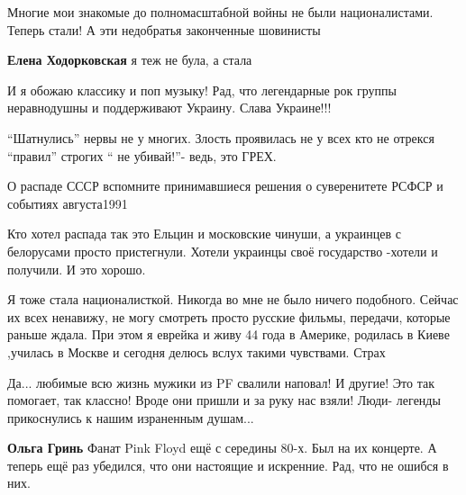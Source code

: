  
 
 
 
 
\zzSecCmt

\begin{itemize} %
Многие мои знакомые до полномасштабной войны не были националистами. Теперь стали! А эти недобратья законченные шовинисты

\textbf{Елена Ходорковская} я теж не була, а стала


И я обожаю классику и поп музыку! Рад, что легендарные рок группы неравнодушны
и поддерживают Украину. Слава Украине!!!


\enquote{Шатнулись} нервы не у многих. Злость проявилась не у всех кто не
отрекся \enquote{правил} строгих \enquote{ не убивай!}- ведь, это ГРЕХ.


О распаде СССР вспомните принимавшиеся решения о суверенитете РСФСР и событиях августа1991

Кто хотел распада так это Ельцин и московские чинуши, а украинцев с белорусами
просто пристегнули. Хотели украинцы своё государство -хотели и получили. И это
хорошо.


Я тоже стала националисткой. Никогда во мне не было ничего подобного. Сейчас
их всех ненавижу, не могу смотреть просто русские фильмы, передачи, которые
раньше ждала. При этом я еврейка и живу 44 года в Америке, родилась в Киеве
,училась в Москве и сегодня делюсь вслух такими чувствами. Страх



Да... любимые всю жизнь мужики из PF свалили наповал! И другие! Это так
помогает, так классно! Вроде они пришли и за руку нас взяли! Люди- легенды
прикоснулись к нашим израненным душам...

\begin{itemize} %
\textbf{Ольга Гринь}
Фанат Pink Floyd ещё с середины 80-х.
Был на их концерте. А теперь ещё раз убедился, что они настоящие и искренние. Рад, что не ошибся в них.


\end{itemize}
\end{itemize}
